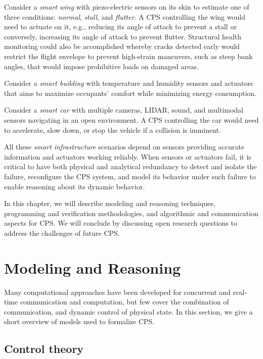 \documentclass[
graybox,
envcountchap
]{svmult}
\begin{document}
\begin{bibunit}

Consider a {\it smart wing} with piezo-electric sensors on its skin to estimate one of three conditions:  {\it normal}, {\it stall}, and {\it flutter.}  A CPS controlling the wing would need to actuate on it, e.g., reducing its angle of attack to prevent a stall or conversely, increasing its angle of attack to prevent flutter.  Structural health monitoring could also be accomplished whereby cracks detected early would restrict the flight envelope to prevent high-strain maneuvers, such as steep bank angles, that would impose prohibitive loads on damaged areas.

Consider a {\it smart building} with temperature and humidity sensors and actuators that aims to maximize occupants' comfort while minimizing energy consumption.  

Consider a {\it smart car} with multiple cameras, LIDAR, sound, and multimodal sensors navigating in an open environment.  A CPS controlling the car would need to accelerate, slow down, or stop the vehicle if a collision is imminent.

All these {\it smart infrastructure} scenarios depend on sensors providing accurate information and actuators working reliably.  When sensors or actuators fail, it is critical to have both physical and analytical redundancy to detect and isolate the failure, reconfigure the CPS system, and model its behavior under such failure to enable reasoning about its dynamic behavior.

In this chapter, we will describe modeling and reasoning techniques, programming and verification methodologies, and algorithmic and communication aspects for CPS.  We will conclude by discussing open research questions to address the challenges of future CPS.

\section{Modeling and Reasoning} %

Many computational approaches have been developed for concurrent and real-time communication and computation, but few cover the combination of communication, and dynamic control of physical state.
In this section, we give a short overview of models used to formalize CPS.

    \subsection{Control theory}


\end{bibunit}
\end{document}
